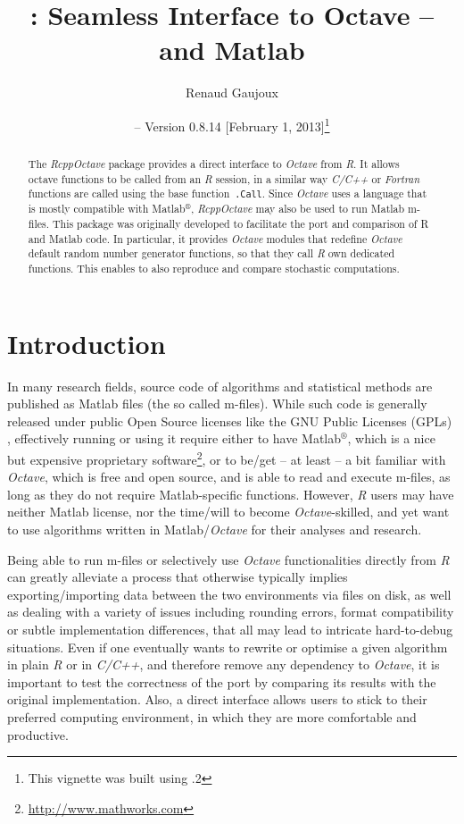 \documentclass[english,10pt,a4paper]{article}\usepackage{graphicx, color}
\author{Renaud Gaujoux}
\title{\pkgname{RcppOctave}: Seamless Interface to Octave -- and Matlab}
\date{\Rpkg{RcppOctave} -- Version 0.8.14
[February  1, 2013]\footnote{This vignette was built using \octave
3.6.2}}
\newcommand{\matlab}{Matlab$^\circledR$\xspace}
\let\proglang=\textit
\let\code=\texttt
\newcommand{\pkgname}[1]{\textit{#1}\xspace}
\newcommand{\Rpkg}[1]{\pkgname{#1} package\xspace}
\newcommand{\R}{\proglang{R}\xspace}
\newcommand{\octave}{\proglang{Octave}\xspace}
\begin{document}
\maketitle

\begin{abstract}
The \Rpkg{RcppOctave} provides a direct interface to \octave from
\R.
It allows \\octave functions to be called from an \R session,
in a similar way \proglang{C/C++} or \proglang{Fortran} functions are called using the base function~\code{.Call}.
Since \octave uses a language that is mostly compatible with \matlab,
\pkgname{RcppOctave} may also be used to run Matlab m-files.
This package was originally developed to facilitate the port and comparison of R
and Matlab code.
In particular, it provides \octave modules that redefine
\octave default random number generator functions, so that they call
\proglang{R} own dedicated functions.
This enables to also reproduce and compare stochastic computations.
\end{abstract}

\noindent\hrulefill
\tableofcontents
\noindent\hrulefill

\section{Introduction}

In many research fields, source code of algorithms and statistical methods are
published as Matlab files (the so called m-files).
While such code is generally released under public Open Source licenses like the
GNU Public Licenses (GPLs) \cite{gnuGPL}, effectively running or using it
require either to have \matlab, which is a nice but expensive proprietary
software\footnote{\url{http://www.mathworks.com}}, or to be/get -- at least -- a bit familiar with \octave \cite{Eaton2002}, which is free and open source, and is able to read and execute m-files, as long as they do not require Matlab-specific functions.
However, \proglang{R} users may have neither Matlab license, nor the
time/will to become \octave-skilled, and yet want to use algorithms written in
Matlab/\octave for their analyses and research.

Being able to run m-files or selectively use \octave functionalities
directly from \proglang{R} can greatly alleviate a process that otherwise
typically implies exporting/importing data between the two environments via
files on disk, as well as dealing with a variety of issues including
rounding errors, format compatibility or subtle implementation differences,
that all may lead to intricate hard-to-debug situations.
Even if one eventually wants to rewrite or optimise a given algorithm in plain
\proglang{R} or in \proglang{C/C++}, and therefore remove any dependency to
\octave, it is important to test the correctness of the port by
comparing its results with the original implementation.
Also, a direct interface allows users to stick to their preferred computing
environment, in which they are more comfortable and productive.
\end{document}
